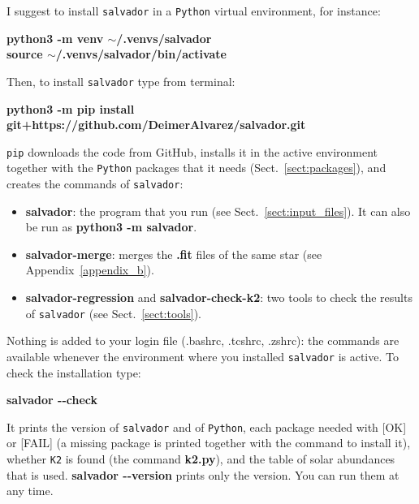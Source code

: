 \documentclass[modern]{aastex701}
\begin{document}
I suggest to install \texttt{salvador} in a \texttt{Python} virtual environment, for instance:
\begin{center}
    \textbf{python3 -m venv $\sim$/.venvs/salvador} \\
    \textbf{source $\sim$/.venvs/salvador/bin/activate}
\end{center}
Then, to install \texttt{salvador} type from terminal:
\begin{center}
    \textbf{python3 -m pip install git+https://github.com/DeimerAlvarez/salvador.git}
\end{center}
\texttt{pip} downloads the code from GitHub, installs it in the active environment together with the \texttt{Python} packages that it needs (Sect.~\ref{sect:packages}), and creates the commands of \texttt{salvador}:
\begin{itemize}
    \item {\bf salvador}: the program that you run (see Sect.~\ref{sect:input_files}). It can also be run as {\bf python3 -m salvador}.
    \item {\bf salvador-merge}: merges the {\bf .fit} files of the same star (see Appendix~\ref{appendix_b}).
    \item {\bf salvador-regression} and {\bf salvador-check-k2}: two tools to check the results of \texttt{salvador} (see Sect.~\ref{sect:tools}).
\end{itemize}
Nothing is added to your login file (.bashrc, .tcshrc, .zshrc): the commands are available whenever the environment where you installed \texttt{salvador} is active. To check the installation type:
\begin{center}
    \textbf{salvador -{}-check}
\end{center}
It prints the version of \texttt{salvador} and of \texttt{Python}, each package needed with [OK] or [FAIL] (a missing package is printed together with the command to install it), whether \texttt{K2} is found (the command {\bf k2.py}), and the table of solar abundances that is used. {\bf salvador -{}-version} prints only the version. You can run them at any time.
\end{document}
